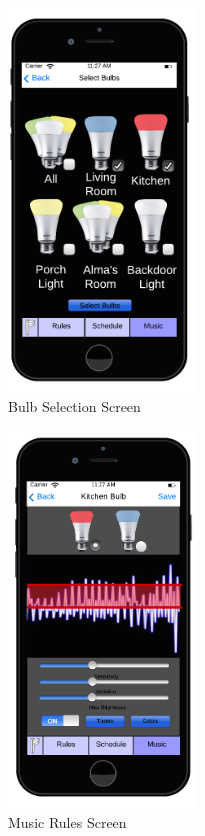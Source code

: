 \documentclass[12pt]{article}
\begin{document}
  \begin{figure}[ht!]
    \centering
    \includegraphics[width=50mm]{iPhone_music_select_bulb.png}
    \caption{Bulb Selection Screen}
    \label{fig:bulbSelectionScreen}
  \end{figure}
  
  \begin{figure}[ht!]
    \centering
    \includegraphics[width=50mm]{iPhone_music_main.png}
    \caption{Music Rules Screen}
    \label{fig:musicRules}
  \end{figure}
  
\end{document}
